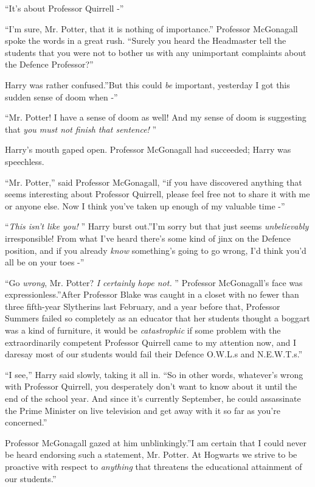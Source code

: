 ``It's about Professor Quirrell -''

``I'm sure, Mr. Potter, that it is nothing of importance.'' Professor
McGonagall spoke the words in a great rush. ``Surely you heard the
Headmaster tell the students that you were not to bother us with any
unimportant complaints about the Defence Professor?''

Harry was rather confused.''But this could \emph{be} important,
yesterday I got this sudden sense of doom when -''

``Mr. Potter! I have a sense of doom as well! And my sense of doom is
suggesting that \emph{you must not finish that sentence!} ''

Harry's mouth gaped open. Professor McGonagall had succeeded; Harry was
speechless.

``Mr. Potter,'' said Professor McGonagall, ``if you have discovered
anything that seems interesting about Professor Quirrell, please feel
free not to share it with me or anyone else. Now I think you've taken up
enough of my valuable time -''

``\emph{This isn't like you!} '' Harry burst out.''I'm sorry but that just
seems \emph{unbelievably} irresponsible! From what I've heard there's
some kind of jinx on the Defence position, and if you already
\emph{know} something's going to go wrong, I'd think you'd all be on
your toes -''

``Go \emph{wrong}, Mr. Potter? \emph{I certainly hope not.} '' Professor
McGonagall's face was expressionless.''After Professor Blake was caught
in a closet with no fewer than three fifth-year Slytherins last
February, and a year before that, Professor Summers failed so completely
as an educator that her students thought a boggart was a kind of
furniture, it would be \emph{catastrophic} if some problem with the
extraordinarily competent Professor Quirrell came to my attention now,
and I daresay most of our students would fail their Defence O.W.L.s and
N.E.W.T.s.''

``I see,'' Harry said slowly, taking it all in. ``So in other words,
whatever's wrong with Professor Quirrell, you desperately don't want to
know about it until the end of the school year. And since it's currently
September, he could assassinate the Prime Minister on live television
and get away with it so far as you're concerned.''

Professor McGonagall gazed at him unblinkingly.''I am certain that I
could never be heard endorsing such a statement, Mr. Potter. At Hogwarts
we strive to be proactive with respect to \emph{anything} that threatens
the educational attainment of our students.''

